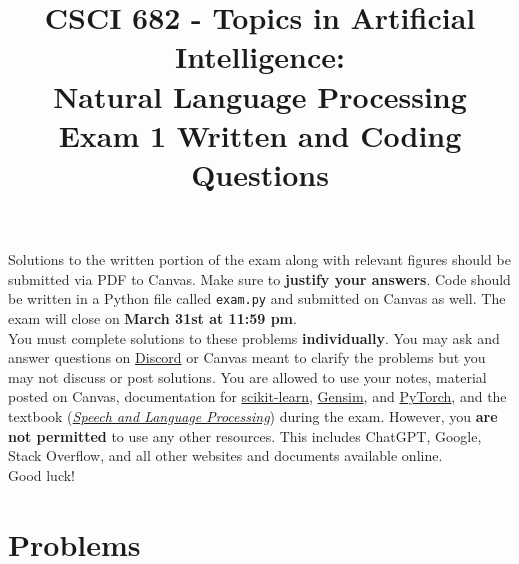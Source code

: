\documentclass{article}
\title{CSCI 682 - Topics in Artificial Intelligence: \\ Natural Language Processing \\ Exam 1 Written and Coding Questions}
\author{ }
\date{}
\begin{document}
\maketitle

\noindent Solutions to the written portion of the exam along with relevant figures should be submitted via PDF to Canvas. Make sure to \textbf{justify your answers}. Code should be written in a Python file called \verb|exam.py| and submitted on Canvas as well. The exam will close on \textbf{March 31st at 11:59 pm}. \\

\noindent You must complete solutions to these problems \textbf{individually}. You may ask and answer questions on \href{https://discord.gg/BK3B3xJeZA}{Discord} or Canvas meant to clarify the problems but you may not discuss or post solutions. You are allowed to use your notes, material posted on Canvas, documentation for \href{https://scikit-learn.org/stable/}{scikit-learn}, \href{https://radimrehurek.com/gensim/}{Gensim}, and \href{https://pytorch.org/}{PyTorch}, and the textbook (\href{https://web.stanford.edu/~jurafsky/slp3/}{\textit{Speech and Language Processing}}) during the exam. However, you \textbf{are not permitted} to use any other resources. This includes ChatGPT, Google, Stack Overflow, and all other websites and documents available online. \\

\noindent Good luck!


\section*{Problems}
\end{document}

